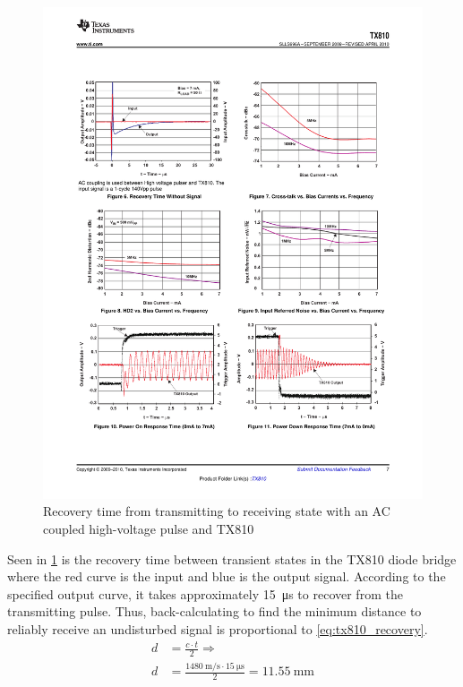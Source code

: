 \begin{figure}[htbp]
	\centering
	\includegraphics[width=.8\textwidth]{Figures/3_tx810_recovery.pdf}
	\caption[Recovery time from transmitting to receiving state with an AC coupled high-voltage pulse and TX810]{Recovery time from transmitting to receiving state with an AC coupled high-voltage pulse and TX810 \cite{TX810}}
	\label{fig:3_switch_recovery}
\end{figure}
Seen in \cref{fig:3_switch_recovery} is the recovery time between transient states in the TX810 diode bridge where the red curve is the input and blue is the output signal. According to the specified output curve, it takes approximately \qty{15}{\micro\second} to recover from the transmitting pulse. Thus, back-calculating to find the minimum distance to reliably receive an undisturbed signal is proportional to \cref{eq:tx810_recovery}.
\begin{subequations} \label{eq:tx810_recovery}
\begin{align}
	d &= \frac{c \cdot t}{2} \Longrightarrow \\
	d &= \frac{\qty{1480}{\meter\per\second} \cdot \qty{15}{\micro\second}}{2} = \qty{11.55}{\milli\meter}
\end{align}
\end{subequations}
